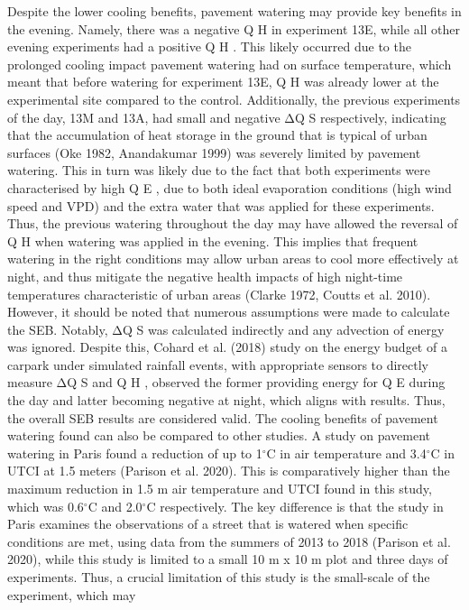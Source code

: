 \documentclass[final,3p,times,authoryear]{elsarticle}
\begin{document}
Despite the lower cooling benefits, pavement watering may provide key benefits in the
evening. Namely, there was a negative Q H in experiment 13E, while all other evening
experiments had a positive Q H . This likely occurred due to the prolonged cooling impact
pavement watering had on surface temperature, which meant that before watering for
experiment 13E, Q H was already lower at the experimental site compared to the control.
Additionally, the previous experiments of the day, 13M and 13A, had small and
negative ΔQ S respectively, indicating that the accumulation of heat storage in the ground
that is typical of urban surfaces (Oke 1982, Anandakumar 1999) was severely limited
by pavement watering. This in turn was likely due to the fact that both experiments were
characterised by high Q E , due to both ideal evaporation conditions (high wind speed and
VPD) and the extra water that was applied for these experiments. Thus, the previous
watering throughout the day may have allowed the reversal of Q H when watering was
applied in the evening. This implies that frequent watering in the right conditions may
allow urban areas to cool more effectively at night, and thus mitigate the negative health
impacts of high night-time temperatures characteristic of urban areas (Clarke 1972,
Coutts et al. 2010).
However, it should be noted that numerous assumptions were made to calculate the
SEB. Notably, ΔQ S was calculated indirectly and any advection of energy was ignored.
Despite this, Cohard et al. (2018) study on the energy budget of a carpark under
simulated rainfall events, with appropriate sensors to directly measure ΔQ S and Q H , observed the former providing energy for Q E during the day and latter becoming
negative at night, which aligns with results. Thus, the overall SEB results are considered
valid.
The cooling benefits of pavement watering found can also be compared to other studies.
A study on pavement watering in Paris found a reduction of up to 1$^{\circ}$C in air
temperature and 3.4$^{\circ}$C in UTCI at 1.5 meters (Parison et al. 2020). This is
comparatively higher than the maximum reduction in 1.5 m air temperature and UTCI
found in this study, which was 0.6$^{\circ}$C and 2.0$^{\circ}$C respectively. The key difference is that
the study in Paris examines the observations of a street that is watered when specific
conditions are met, using data from the summers of 2013 to 2018 (Parison et al. 2020),
while this study is limited to a small 10 m x 10 m plot and three days of experiments.
Thus, a crucial limitation of this study is the small-scale of the experiment, which may
\end{document}
